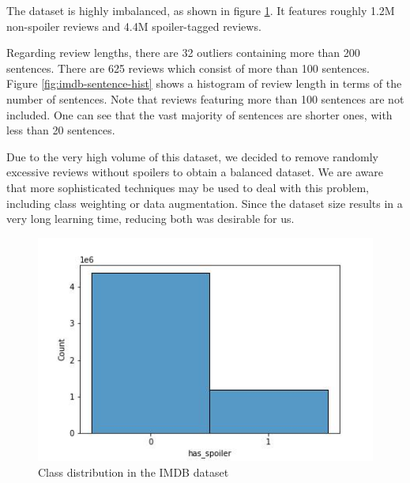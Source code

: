 \documentclass[11pt]{article}
\begin{document}
The dataset is highly imbalanced, as shown in figure \ref{fig:imdb-classes}. It features roughly 1.2M non-spoiler reviews and 4.4M spoiler-tagged reviews.

Regarding review lengths, there are 32 outliers containing more than 200 sentences. There are 625 reviews which consist of more than 100 sentences. Figure \ref{fig:imdb-sentence-hist} shows a histogram of review length in terms of the number of sentences. Note that reviews featuring more than 100 sentences are not included. One can see that the vast majority of sentences are shorter ones, with less than 20 sentences.

Due to the very high volume of this dataset, we decided to remove randomly excessive reviews without spoilers to obtain a balanced dataset. We are aware that more sophisticated techniques may be used to deal with this problem, including class weighting or data augmentation. Since the dataset size results in a very long learning time, reducing both was desirable for us.


\begin{figure}[h]
    \centering
    \includegraphics[width=\columnwidth]{img/imdb_classes.jpg}
    \caption{Class distribution in the IMDB dataset}
    \label{fig:imdb-classes}
\end{figure}
\end{document}
